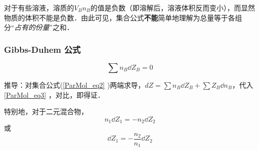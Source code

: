 对于有些溶液，溶质的${V_B}n_B$的值是负数（即溶解后，溶液体积反而变小），而显然物质的体积不能是负数．由此可见，集合公式\textbf{不能}简单地理解为总量等于各组分“\textsl{占有的份量}”之和．

\subsubsection{Gibbs-Duhem 公式}
\begin{equation}
\sum n_B \dd Z_B = 0
\end{equation}

推导：对集合公式(\autoref{ParMol_eq2} )两端求导，$dZ=\sum n_B \dd Z_B + \sum {Z_B}  \dd n_B$，代入 \autoref{ParMol_eq3} ，对比，即得证．

特别地，对于二元混合物，
\begin{equation}
n_1 \dd {Z_1} = - n_2 \dd {Z_2}
\end{equation}
或
\begin{equation}
\dd {Z_1} = -\frac{n_2}{n_1} \dd {Z_2}
\end{equation}


